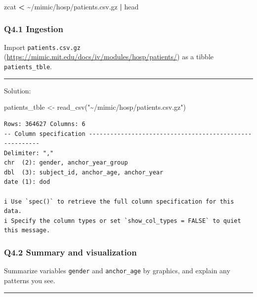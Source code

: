 \documentclass[
]{article}
\newenvironment{Shaded}{\begin{snugshade}}{\end{snugshade}}
\newcommand{\FunctionTok}[1]{\textcolor[rgb]{0.00,0.00,0.00}{#1}}
\newcommand{\KeywordTok}[1]{\textcolor[rgb]{0.13,0.29,0.53}{\textbf{#1}}}
\newcommand{\NormalTok}[1]{\textcolor[rgb]{0.00,0.00,0.00}{#1}}
\newcommand{\OperatorTok}[1]{\textcolor[rgb]{0.81,0.36,0.00}{\textbf{#1}}}
\newcommand{\OtherTok}[1]{\textcolor[rgb]{0.56,0.35,0.01}{#1}}
\newcommand{\StringTok}[1]{\textcolor[rgb]{0.31,0.60,0.02}{#1}}
\begin{document}
\begin{Shaded}
\begin{Highlighting}[]
\FunctionTok{zcat} \OperatorTok{\textless{}}\NormalTok{ \textasciitilde{}/mimic/hosp/patients.csv.gz }\KeywordTok{|} \FunctionTok{head}
\end{Highlighting}
\end{Shaded}

\hypertarget{q4.1-ingestion}{%
\subsubsection{Q4.1 Ingestion}\label{q4.1-ingestion}}

Import \texttt{patients.csv.gz}
(\url{https://mimic.mit.edu/docs/iv/modules/hosp/patients/}) as a tibble
\texttt{patients\_tble}.

\begin{center}\rule{0.5\linewidth}{0.5pt}\end{center}

Solution:

\begin{Shaded}
\begin{Highlighting}[]
\NormalTok{patients\_tble }\OtherTok{\textless{}{-}} \FunctionTok{read\_csv}\NormalTok{(}\StringTok{"\textasciitilde{}/mimic/hosp/patients.csv.gz"}\NormalTok{)}
\end{Highlighting}
\end{Shaded}

\begin{verbatim}
Rows: 364627 Columns: 6
-- Column specification --------------------------------------------------------
Delimiter: ","
chr  (2): gender, anchor_year_group
dbl  (3): subject_id, anchor_age, anchor_year
date (1): dod

i Use `spec()` to retrieve the full column specification for this data.
i Specify the column types or set `show_col_types = FALSE` to quiet this message.
\end{verbatim}

\hypertarget{q4.2-summary-and-visualization}{%
\subsubsection{Q4.2 Summary and
visualization}\label{q4.2-summary-and-visualization}}

Summarize variables \texttt{gender} and \texttt{anchor\_age} by
graphics, and explain any patterns you see.

\begin{center}\rule{0.5\linewidth}{0.5pt}\end{center}
\end{document}
